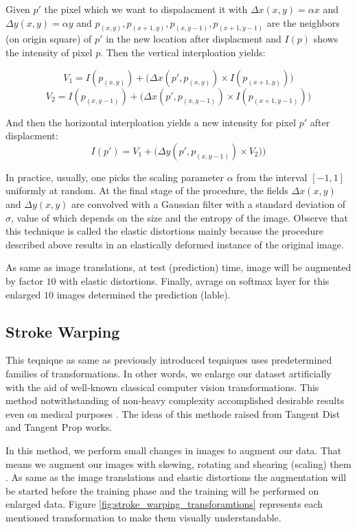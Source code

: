\begin{definition}{}
  Given $p'$ the pixel which we want to dispalacment it with $\Delta x(x,y)= \alpha x$ and $\Delta y(x,y)= \alpha y$ and $p_{(x,y)}, p_{(x+1,y)}, p_{(x,y-1)}, p_{(x+1,y-1)}$ are the neighbors (on
  origin square) of $p'$ in the new location after displacment and $I(p)$ shows the intensity of pixel $p$. Then the vertical interploation yields:

  $$V_1 = I(p_{(x,y)}) + \big( \Delta x(p', p_{(x,y)}) \times I(p_{(x+1,y)}) \big)$$
  $$V_2 = I(p_{(x,y-1)}) + \big( \Delta x(p', p_{(x,y-1)}) \times I(p_{(x+1,y-1)}) \big)$$

  And then the horizontal interploation yields a new intensity for pixel $p'$ after displacment:
  $$I(p') = V_1 + \big( \Delta y(p', p_{(x,y-1)}) \times V_2) \big)$$
\end{definition}

In practice, usually, one picks the scaling parameter $\alpha$ from the interval $[-1, 1]$ uniformly at random. At the final stage of the procedure, the fields  $\Delta x(x,  y)$ and $\Delta y(x,  y)$ are convolved with a Gaussian filter with a standard deviation of $\sigma$, value of which depends on the size and the entropy of the image. Observe that this technique is called the elastic distortions mainly because the procedure described above results in an elastically deformed instance of the original image.

As same as image translations, at test (prediction) time, image will be augmented by factor $10$
with elastic distortions. Finally, avrage on softmax layer for this enlarged $10$ images determined
the prediction (lable).

\subsection{Stroke Warping}
\label{tit:stroke-warping}
This teqnique as same as previously introduced teqniques uses predetermined families of transformations.
In other words, we enlarge our dataset artificially with the aid of well-known classical computer
vision transformations. This method notwithstanding of non-heavy complexity accomplished desirable
results even on medical purposes \cite{stroke_tumor}. The ideas of this methode raised from Tangent
Dist \cite{stroke_idea_1992} and Tangent Prop \cite{stroke_idea_1993} works.

In this method, we perform small changes in images to augment our data.  That means we augment our
images with skewing, rotating and shearing (scaling) them \cite{storke_warping_1997_source}. As same as the
image translations and elastic distortions the augmentation will be started before the
training phase and the training will be performed on enlarged data. Figure
\ref{fig:stroke_warping_transforamtions} represents each mentioned transformation to make them visually
understandable.

